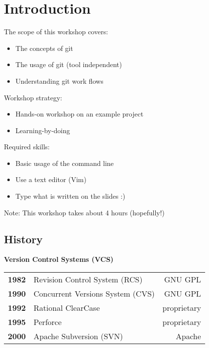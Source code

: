 \section{Introduction}
\begin{frame}
  \slidetitle
  The scope of this workshop covers:
  \begin{itemize}
    \item The concepts of git
    \item The usage of git (tool independent)
    \item Understanding git work flows
  \end{itemize}

  \pause
  \vspace{1em}
  Workshop strategy:
  \begin{itemize}
    \item Hands-on workshop on an example project
    \item Learning-by-doing
  \end{itemize}

  \pause
  \vspace{1em}
  Required skills:
  \begin{itemize}
    \item Basic usage of the command line
    \item Use a text editor (Vim)
    \item Type what is written on the slides :)
  \end{itemize}

  \vspace{1em}
  Note: This workshop takes about 4 hours (hopefully!)
\end{frame}

\subsection{History}
\begin{frame}
  \subslidetitle

  \textbf{Version Control Systems (VCS)}
  \pause
  \\
  \begin{tabular}{lp{6cm}r}
    \textbf{1982} & Revision Control System (RCS) & GNU GPL \\
    \pause
    \textbf{1990} & Concurrent Versions System (CVS) & GNU GPL \\
    \pause
    \textbf{1992} & Rational ClearCase & proprietary \\
    \pause
    \textbf{1995} & Perforce  & proprietary \\
    \pause
    \textbf{2000} & Apache Subversion (SVN)  & Apache \\
  \end{tabular}
\end{frame}

